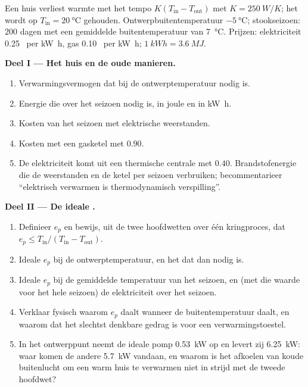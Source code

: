 \begin{problem}
\label{pb:b1:heat-engines:1}
Een huis verliest warmte met het tempo $K(T_{\mathrm{in}} - T_{\mathrm{out}})$ met
$K = \qty{250}{W/K}$; het wordt op $T_{\mathrm{in}} = \qty{20}{\degreeCelsius}$ gehouden.
Ontwerpbuitentemperatuur $\qty{-5}{\degreeCelsius}$; stookseizoen:
$200$ dagen met een gemiddelde buitentemperatuur van \qty{7}{\degreeCelsius}.
Prijzen: elektriciteit 0.25~\texteuro{} per \unit{kW h}, gas 0.10~\texteuro{} per
\unit{kW h}; $\qty{1}{kW h} = \qty{3.6}{MJ}$.

\medskip
\noindent\textbf{Deel I --- Het huis en de oude manieren.}
\begin{enumerate}
  \item Verwarmingsvermogen dat bij de ontwerptemperatuur nodig is.
  \item Energie die over het seizoen nodig is, in joule en in \unit{kW h}.
  \item Kosten van het seizoen met elektrische weerstanden.
  \item Kosten met een gasketel met  $0.90$.
  \item De elektriciteit komt uit een thermische centrale met 
        $0.40$. Brandstofenergie die de weerstanden en de ketel per seizoen
        verbruiken; becommentarieer ``elektrisch verwarmen is thermodynamisch
        verspilling''.
\end{enumerate}

\medskip
\noindent\textbf{Deel II --- De ideale .}
\begin{enumerate}[resume]
  \item Definieer $e_p$ en bewijs, uit de twee hoofdwetten over één kringproces, dat
        $e_p \leq T_{\mathrm{in}}/(T_{\mathrm{in}} - T_{\mathrm{out}})$.
  \item Ideale $e_p$ bij de ontwerptemperatuur, en het 
        dat dan nodig is.
  \item Ideale $e_p$ bij de gemiddelde temperatuur van het seizoen, en (met die
        waarde voor het hele seizoen) de elektriciteit over het seizoen.
  \item Verklaar fysisch waarom $e_p$ daalt wanneer de buitentemperatuur
        daalt, en waarom dat het slechtst denkbare gedrag is voor een
        verwarmingstoestel.
  \item In het ontwerppunt neemt de ideale pomp \qty{0.53}{kW} op en
        levert zij \qty{6.25}{kW}: waar komen de andere \qty{5.7}{kW} vandaan,
        en waarom is het afkoelen van koude buitenlucht om een warm huis te verwarmen
        niet in strijd met de tweede hoofdwet?
\end{enumerate}


\end{problem}
